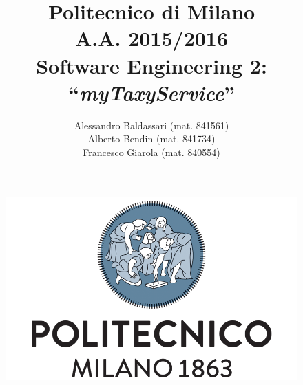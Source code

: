 \documentclass[a4paper,11pt]{report} %
\title{Politecnico di Milano\\A.A. 2015/2016\\Software Engineering 2: ``{\em myTaxyService}''}
\author{Alessandro Baldassari (mat. 841561) \\ Alberto Bendin (mat. 841734) \\ Francesco Giarola (mat. 840554)}
\begin{document}
	
	
	\begin{figure}[t]
		\centering
			\includegraphics[width=1\linewidth]{"Pictures/polimi-logo"}
		\label{fig:polimi-logo}
	\end{figure}
	
	\maketitle
		
	

	\thispagestyle{empty}
	\clearpage\mbox{}\clearpage
	
	
	
	\renewcommand*\thesection{\arabic{section}}
	\renewcommand*\thesubsection{\arabic{section}.\arabic{subsection}}
	\renewcommand*\thesubsubsection{%
		\arabic{section}.\arabic{subsection}.\arabic{subsubsection}%
	}
	\setcounter{secnumdepth}{4}
	\setcounter{tocdepth}{4}
		
	
	\tableofcontents
	\newpage
	
	
	
\end{document}
